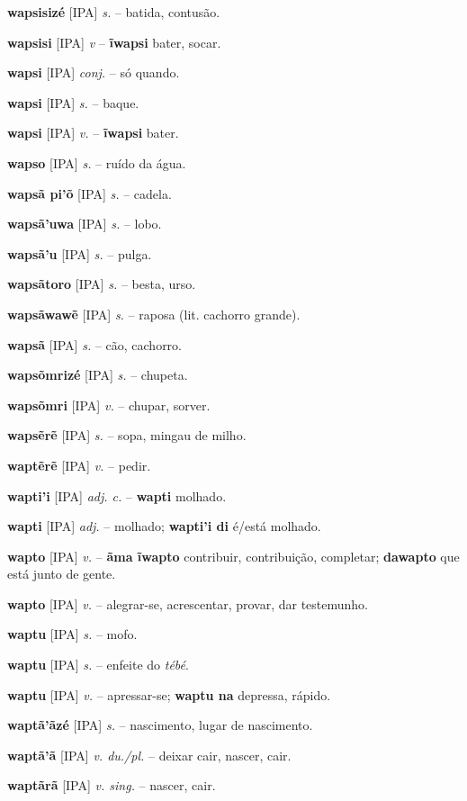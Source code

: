 \textbf{wapsisizé} [IPA] \textit{s.} -- batida, contusão.

\textbf{wapsisi} [IPA] \textit{v} -- \textbf{ĩwapsi} bater, socar.

\textbf{wapsi} [IPA] \textit{conj.} -- só quando.

\textbf{wapsi} [IPA] \textit{s.} -- baque.

\textbf{wapsi} [IPA] \textit{v.} -- \textbf{ĩwapsi} bater.

\textbf{wapso} [IPA] \textit{s.} -- ruído da água.

\textbf{wapsã pi'õ} [IPA] \textit{s.} -- cadela.

\textbf{wapsã'uwa} [IPA] \textit{s.} -- lobo.

\textbf{wapsã'u} [IPA] \textit{s.} -- pulga.

\textbf{wapsãtoro} [IPA] \textit{s.} -- besta, urso.

\textbf{wapsãwawẽ} [IPA] \textit{s.} -- raposa (lit. cachorro grande).

\textbf{wapsã} [IPA] \textit{s.} -- cão, cachorro.

\textbf{wapsõmrizé} [IPA] \textit{s.} -- chupeta.

\textbf{wapsõmri} [IPA] \textit{v.} -- chupar, sorver.

\textbf{wapsẽrẽ} [IPA] \textit{s.} -- sopa, mingau de milho.

\textbf{waptẽrẽ} [IPA] \textit{v.} -- pedir.

\textbf{wapti'i} [IPA] \textit{adj. c.} -- \textbf{wapti} molhado.

\textbf{wapti} [IPA] \textit{adj.} -- molhado; \textbf{wapti'i di} é/está molhado.

\textbf{wapto} [IPA] \textit{v.} -- \textbf{ãma ĩwapto} contribuir, contribuição, completar; \textbf{dawapto} que está junto de gente.

\textbf{wapto} [IPA] \textit{v.} -- alegrar-se, acrescentar, provar, dar testemunho.

\textbf{waptu} [IPA] \textit{s.} -- mofo.

\textbf{waptu} [IPA] \textit{s.} -- enfeite do \textit{tébé}.

\textbf{waptu} [IPA] \textit{v.} -- apressar-se; \textbf{waptu na} depressa, rápido.

\textbf{waptã'ãzé} [IPA] \textit{s.} -- nascimento, lugar de nascimento.

\textbf{waptã'ã} [IPA] \textit{v. du./pl.} -- deixar cair, nascer, cair.

\textbf{waptãrã} [IPA] \textit{v. sing.} -- nascer, cair.


